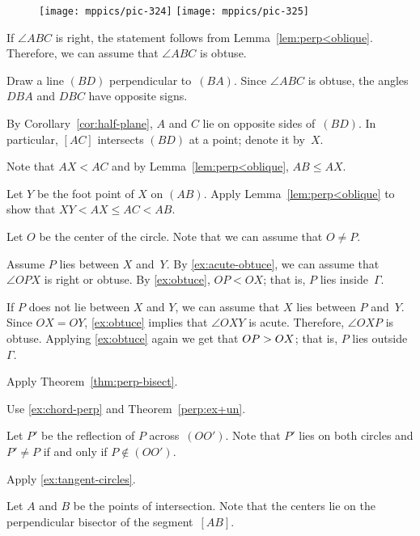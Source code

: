 {

\begin{wrapfigure}{r}{27mm}
\vskip-7mm
\centering
\texttt{[image: mppics/pic-324]}
\bigskip
\texttt{[image: mppics/pic-325]}
\end{wrapfigure}

If $\angle ABC$ is right, the statement follows from Lemma~\ref{lem:perp<oblique}.
Therefore, we can assume that $\angle ABC$ is obtuse.

Draw a line $(BD)$ perpendicular to~$(BA)$.
Since $\angle ABC$ is obtuse, 
the angles $DBA$ and $DBC$ have opposite signs.

By Corollary~\ref{cor:half-plane},
$A$ and $C$ lie on opposite sides of~$(BD)$.
In particular, $[AC]$ intersects $(BD)$ at a point; denote it by~$X$.

Note that $AX<AC$ and by Lemma~\ref{lem:perp<oblique}, $AB\le AX$.


Let $Y$ be the foot point of $X$ on $(AB)$.
Apply Lemma~\ref{lem:perp<oblique} to show that 
$XY<AX\le AC<AB$.

Let $O$ be the center of the circle.
Note that we can assume that $O\ne P$.

}

Assume $P$ lies between $X$ and~$Y$.
By \ref{ex:acute-obtuce}, we can assume that $\angle OPX$ is right or obtuse.
By \ref{ex:obtuce}, $OP<OX$; 
that is, $P$ lies inside~$\Gamma$.

If $P$ does not lie between $X$ and $Y$, we can assume that $X$ lies between $P$ and~$Y$.
Since $OX=OY$, \ref{ex:obtuce} implies that $\angle OXY$ is acute.
Therefore, $\angle OXP$ is obtuse.
Applying \ref{ex:obtuce} again we get that $OP\z>OX$;
that is, $P$ lies outside~$\Gamma$.

 Apply Theorem~\ref{thm:perp-bisect}.

 Use \ref{ex:chord-perp} and Theorem~\ref{perp:ex+un}.

Let $P'$ be the reflection of $P$ across~$(OO')$.
Note that $P'$ lies on both circles and $P'\ne P$ if and only if $P\notin(OO')$.

  Apply \ref{ex:tangent-circles}.

Let $A$ and $B$ be the points of intersection.
Note that the centers lie on the perpendicular bisector of the segment~$[AB]$.

